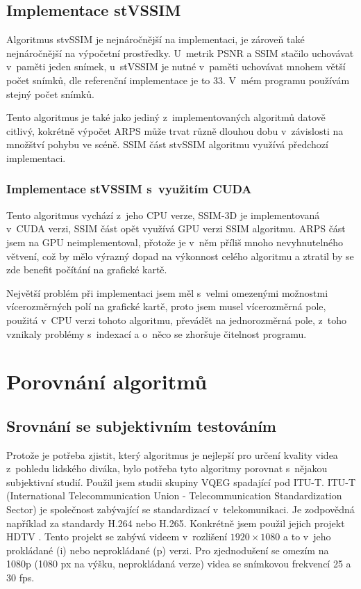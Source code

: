 \documentclass[thesis=M,czech]{FITthesis}[2016/06/26]
\begin{document}
\section{Implementace stVSSIM}
Algoritmus stvSSIM  je nejnáročnější na implementaci, je zároveň také nejnáročnější na výpočetní prostředky. U~metrik PSNR a SSIM stačilo uchovávat v~paměti jeden snímek, u~stVSSIM je nutné v~paměti uchovávat mnohem větší počet snímků, dle referenční implementace je to 33. V~mém programu používám stejný počet snímků.

Tento algoritmus je také jako jediný z~implementovaných algoritmů datově citlivý, kokrétně výpočet ARPS může trvat různě dlouhou dobu v~závislosti na množštví pohybu ve scéně. SSIM část stvSSIM algoritmu využívá předchozí implementaci.
\subsection{Implementace stVSSIM s~využitím CUDA}
Tento algoritmus vychází z~jeho CPU verze, SSIM-3D je implementovaná v~CUDA verzi, SSIM část opět využívá GPU verzi SSIM algoritmu. ARPS část jsem na GPU neimplementoval, přotože je v~něm příliš mnoho nevyhnutelného větvení, což by mělo výrazný dopad na výkonnost celého algoritmu a ztratil by se zde benefit počítání na grafické kartě.

Největší problém při implementaci jsem měl s~velmi omezenými možnostmi vícerozměrných polí na grafické kartě, proto jsem musel vícerozměrná pole, použitá v~CPU verzi tohoto algoritmu, převádět na jednorozměrná pole, z~toho vznikaly problémy s~indexací a o~něco se zhoršuje čitelnost programu.

\chapter{Porovnání algoritmů} \label{chap:eval}
\section{Srovnání se subjektivním testováním}
Protože je potřeba zjistit, který algoritmus je nejlepší pro určení kvality videa z~pohledu lidského diváka, bylo potřeba tyto algoritmy porovnat s~nějakou subjektivní studií. Použil jsem studii skupiny VQEG spadající pod ITU-T. ITU-T (International Telecommunication Union - Telecommunication Standardization Sector) je společnost zabývající se standardizací v~telekomunikaci. Je zodpovědná například za standardy H.264 nebo H.265. Konkrétně jsem použil jejich projekt HDTV \cite{hdtv}. Tento projekt se zabývá videem v~rozlišení $1920 \times 1080$ a to v~jeho prokládané (i) nebo neprokládané (p) verzi. Pro zjednodušení se omezím na 1080p (1080 px na výšku, neprokládaná verze) videa se snímkovou frekvencí 25 a 30 fps. 
\end{document}
